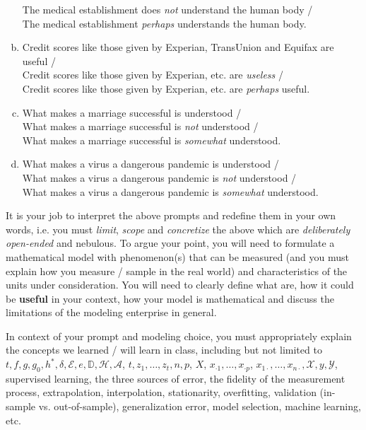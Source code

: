 \documentclass[12pt]{article}
\begin{document}
\begin{enumerate}[(a)]
The medical establishment does \textit{not} understand the human body / \\
The medical establishment \textit{perhaps} understands the human body.
\item Credit scores like those given by Experian, TransUnion and Equifax are useful / \\
Credit scores like those given by Experian, etc. are \textit{useless} / \\
Credit scores like those given by Experian, etc. are \textit{perhaps} useful.
\item What makes a marriage successful is understood / \\
What makes a marriage successful is \emph{not} understood / \\
What makes a marriage successful is \emph{somewhat} understood.
\item What makes a virus a dangerous pandemic is understood / \\
What makes a virus a dangerous pandemic is \emph{not} understood / \\
What makes a virus a dangerous pandemic is \emph{somewhat} understood.
\end{enumerate}

\noindent It is your job to interpret the above prompts and redefine them in your own words, i.e. you must \textit{limit}, \textit{scope} and \textit{concretize} the above which are \textit{deliberately open-ended} and nebulous. To argue your point, you will need to formulate a mathematical model with phenomenon(s) that can be measured (and you must explain how you measure / sample in the real world) and characteristics of the units under consideration. You will need to clearly define what  are, how it could be \textbf{useful} in your context, how your model is mathematical and discuss the limitations of the modeling enterprise in general. 

In context of your prompt and modeling choice, you must appropriately explain the concepts we learned / will learn in class, including but not limited to $t ,f, g, g_0, h^*, \delta, \mathcal{E}, e, \mathbb{D}, \mathcal{H}, \mathcal{A}$, $t, z_1, \ldots, z_t, n, p$, $X$, $x_{\cdot 1}, \ldots, x_{\cdot p}$, $x_{1 \cdot}, \ldots, x_{n \cdot}, \mathcal{X}, y, \mathcal{Y}$, supervised learning, the three sources of error, the fidelity of the measurement process, extrapolation, interpolation, stationarity, overfitting, validation (in-sample vs. out-of-sample), generalization error, model selection, machine learning, etc. 
\end{document}
